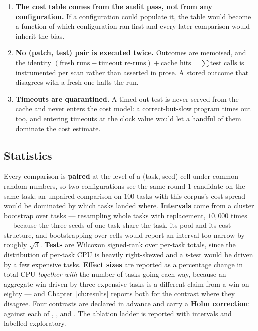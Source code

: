 \begin{enumerate}[leftmargin=*,itemsep=4pt]
\item \textbf{The cost table comes from the audit pass, not from any
configuration.} If a configuration could populate it, the table would become a
function of which configuration ran first and every later comparison would
inherit the bias.
\item \textbf{No (patch, test) pair is executed twice.} Outcomes are memoised,
and the identity
$(\text{fresh runs} - \text{timeout re-runs}) + \text{cache hits} = \sum
\text{test calls}$
is instrumented per scan rather than asserted in prose. A stored outcome that
disagrees with a fresh one halts the run.
\item \textbf{Timeouts are quarantined.} A timed-out test is never served from
the cache and never enters the cost model: a correct-but-slow program times out
too, and entering timeouts at the clock value would let a handful of them
dominate the cost estimate.
\end{enumerate}

\subsection{Statistics}

Every comparison is \textbf{paired} at the level of a (task, seed) cell under
common random numbers, so two configurations see the same round-$1$ candidate
on the same task; an unpaired comparison on $100$ tasks with this corpus's
cost spread would be dominated by which tasks landed where. \textbf{Intervals}
come from a cluster bootstrap over tasks --- resampling whole tasks with
replacement, $10{,}000$ times --- because the three seeds of one task share
the task, its pool and its cost structure, and bootstrapping over cells would
report an interval too narrow by roughly $\sqrt{3}$. \textbf{Tests} are
Wilcoxon signed-rank over per-task totals, since the distribution of per-task
CPU is heavily right-skewed and a $t$-test would be driven by a few expensive
tasks. \textbf{Effect sizes} are reported as a percentage change in total CPU
\emph{together with} the number of tasks going each way, because an aggregate
win driven by three expensive tasks is a different claim from a win on eighty
--- and Chapter~\ref{ch:results} reports both for the contrast where they
disagree. Four contrasts are declared in advance and carry a \textbf{Holm
correction}:  against each of , ,
 and . The ablation ladder is reported with
intervals and labelled exploratory.
